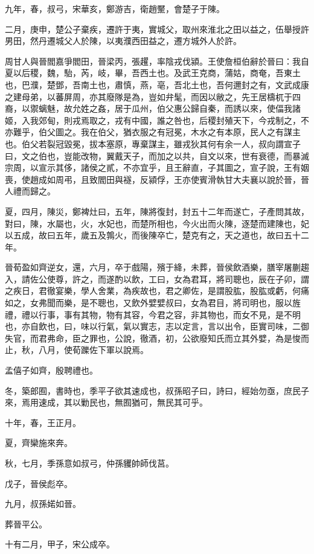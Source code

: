 \begin{pinyinscope}
九年，春，叔弓，宋華亥，鄭游吉，衛趙黶，會楚子于陳。

二月，庚申，楚公子棄疾，遷許于夷，實城父，取州來淮北之田以益之，伍舉授許男田，然丹遷城父人於陳，以夷濮西田益之，遷方城外人於許。

周甘人與晉閻嘉爭閻田，晉梁丙，張趯，率陰戎伐潁。王使詹桓伯辭於晉曰：我自夏以后稷，魏，駘，芮，岐，畢，吾西土也。及武王克商，蒲姑，商奄，吾東土也，巴濮，楚鄧，吾南土也，肅慎，燕，亳，吾北土也，吾何邇封之有，文武成康之建母弟，以蕃屏周，亦其廢隊是為，豈如弁髦，而因以敝之，先王居檮杌于四裔，以禦螭魅，故允姓之姦，居于瓜州，伯父惠公歸自秦，而誘以來，使偪我諸姬，入我郊甸，則戎焉取之，戎有中國，誰之咎也，后稷封殖天下，今戎制之，不亦難乎，伯父圖之。我在伯父，猶衣服之有冠冕，木水之有本原，民人之有謀主也。伯父若裂冠毀冕，拔本塞原，專棄謀主，雖戎狄其何有余一人，叔向謂宣子曰，文之伯也，豈能改物，翼戴天子，而加之以共，自文以來，世有衰德，而暴滅宗周，以宣示其侈，諸侯之貳，不亦宜乎，且王辭直，子其圖之，宣子說，王有姻喪，使趙成如周弔，且致閻田與襚，反潁俘，王亦使賓滑執甘大夫襄以說於晉，晉人禮而歸之。

夏，四月，陳災，鄭裨灶曰，五年，陳將復封，封五十二年而遂亡，子產問其故，對曰，陳，水屬也，火，水妃也，而楚所相也，今火出而火陳，逐楚而建陳也，妃以五成，故曰五年，歲五及鶉火，而後陳卒亡，楚克有之，天之道也，故曰五十二年。

晉荀盈如齊逆女，還，六月，卒于戲陽，殯于絳，未葬，晉侯飲酒樂，膳宰屠蒯趨入，請佐公使尊，許之，而遂酌以飲，工曰，女為君耳，將司聰也，辰在子卯，謂之疾日，君徹宴樂，學人舍業，為疾故也，君之卿佐，是謂股肱，股肱或虧，何痛如之，女弗聞而樂，是不聰也，又飲外嬖嬖叔曰，女為君目，將司明也，服以旌禮，禮以行事，事有其物，物有其容，今君之容，非其物也，而女不見，是不明也，亦自飲也，曰，味以行氣，氣以實志，志以定言，言以出令，臣實司味，二御失官，而君弗命，臣之罪也，公說，徹酒，初，公欲廢知氏而立其外嬖，為是悛而止，秋，八月，使荀躒佐下軍以說焉。

孟僖子如齊，殷聘禮也。

冬，築郎囿，書時也，季平子欲其速成也，叔孫昭子曰，詩曰，經始勿亟，庶民子來，焉用速成，其以勦民也，無囿猶可，無民其可乎。

十年，春，王正月。

夏，齊欒施來奔。

秋，七月，季孫意如叔弓，仲孫貜帥師伐莒。

戊子，晉侯彪卒。

九月，叔孫婼如晉。

葬晉平公。

十有二月，甲子，宋公成卒。


\end{pinyinscope}
